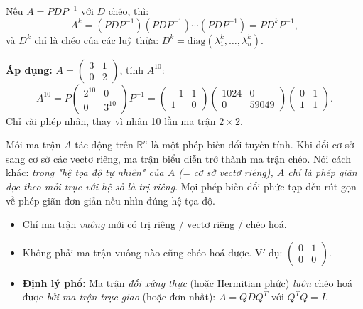 \documentclass[12pt,a4paper]{article}
\begin{document}
\begin{ungdung}[title={Tính $A^k$ nhanh nhờ chéo hoá}]
Nếu $A = PDP^{-1}$ với $D$ chéo, thì:
\[
  A^k = (PDP^{-1})(PDP^{-1})\cdots(PDP^{-1}) = PD^k P^{-1},
\]
và $D^k$ chỉ là chéo của các luỹ thừa: $D^k = \mathrm{diag}(\lambda_1^k, \ldots, \lambda_n^k)$.

\medskip
\textbf{Áp dụng:} $A = \begin{pmatrix}3 & 1\\ 0 & 2\end{pmatrix}$, tính $A^{10}$:
\[
  A^{10} = P\begin{pmatrix}2^{10} & 0\\ 0 & 3^{10}\end{pmatrix}P^{-1} = \begin{pmatrix}-1 & 1\\ 1 & 0\end{pmatrix}\begin{pmatrix}1024 & 0\\ 0 & 59049\end{pmatrix}\begin{pmatrix}0 & 1\\ 1 & 1\end{pmatrix}.
\]
Chỉ vài phép nhân, thay vì nhân 10 lần ma trận $2\times 2$.
\end{ungdung}

\begin{ynghia}[title={Tại sao chéo hoá quan trọng?}]
Mỗi ma trận $A$ tác động trên $\mathbb{R}^n$ là một phép biến đổi tuyến tính. Khi đổi cơ sở sang cơ sở các vectơ riêng, ma trận biểu diễn trở thành ma trận chéo. Nói cách khác: \emph{trong "hệ tọa độ tự nhiên" của $A$ (= cơ sở vectơ riêng), $A$ chỉ là phép giãn dọc theo mỗi trục với hệ số là trị riêng}. Mọi phép biến đổi phức tạp đều rút gọn về phép giãn đơn giản nếu nhìn đúng hệ tọa độ.
\end{ynghia}

\begin{luuy}
\begin{itemize}
  \item Chỉ ma trận \emph{vuông} mới có trị riêng / vectơ riêng / chéo hoá.
  \item Không phải ma trận vuông nào cũng chéo hoá được. Ví dụ: $\begin{pmatrix}0 & 1\\ 0 & 0\end{pmatrix}$.
  \item \textbf{Định lý phổ:} Ma trận \emph{đối xứng thực} (hoặc Hermitian phức) \emph{luôn} chéo hoá được \emph{bởi ma trận trực giao} (hoặc đơn nhất): $A = QDQ^T$ với $Q^T Q = I$.
\end{itemize}
\end{luuy}
\end{document}
